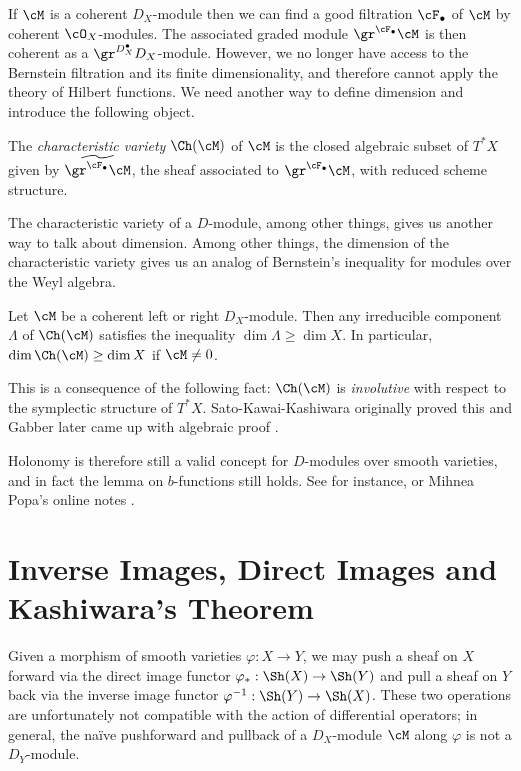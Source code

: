 If $\cM$ is a coherent $D_X$-module then we can find a good filtration $\cF_\bullet$ of $\cM$ by coherent $\cO_X$-modules. The associated graded module $\gr^{\cF_\bullet} \cM$ is then coherent as a $\gr^{D^\bullet_X}D_X$-module. However, we no longer have access to the Bernstein filtration and its finite dimensionality, and therefore cannot apply the theory of Hilbert functions. We need another way to define dimension and introduce the following object.

\begin{defn}\label{defn:characteristic-variety}
	The \emph{characteristic variety} $\Ch(\cM)$ of $\cM$ is the closed algebraic subset of $T^*X$ given by $\widetilde{\gr^{\cF_\bullet}\cM}$, the sheaf associated to $\gr^{\cF_\bullet}\cM$, with reduced scheme structure.
\end{defn}
The characteristic variety of a $D$-module, among other things, gives us another way to talk about dimension. Among other things, the dimension of the characteristic variety gives us an analog of Bernstein's inequality for modules over the Weyl algebra.
\begin{prop}\label{prop:lower-bound-on-dimension}
	Let $\cM$ be a coherent left or right $D_X$-module. Then any irreducible component $\Lambda$ of $\Ch(\cM)$ satisfies the inequality $\dim \Lambda \geq \dim X$. In particular, $\dim \Ch(\cM) \geq \dim X$ if $\cM \neq 0$.
\end{prop}
\begin{prf}
	This is a consequence of the following fact: $\Ch(\cM)$ is \emph{involutive} with respect to the symplectic structure of $T^*X$. Sato-Kawai-Kashiwara originally proved this \cite{sato-kawai-kashiwara} and Gabber later came up with algebraic proof \cite{gabber}.
\end{prf}
Holonomy is therefore still a valid concept for $D$-modules over smooth varieties, and in fact the lemma on $b$-functions still holds. See \cite{kashiwara-b-functions} for instance, or Mihnea Popa's online notes \cite{mpopa-b-function}.

\newpage

\section{Inverse Images, Direct Images and Kashiwara's Theorem}\label{sec:push-pull-kash}
Given a morphism of smooth varieties $\varphi:X\to Y$, we may push a sheaf on $X$ forward via the direct image functor $\varphi_*:\Sh(X)\to \Sh(Y)$ and pull a sheaf on $Y$ back via the inverse image functor $\varphi^{-1}:\Sh(Y) \to \Sh(X)$. These two operations are unfortunately not compatible with the action of differential operators; in general, the na\"ive pushforward and pullback of a $D_X$-module $\cM$ along $\varphi$ is not a $D_Y$-module.

